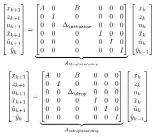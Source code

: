 %
\begin{equation}
    \begin{bmatrix}
        x_{k+1} \\
        z_{k+1} \\
        u_{k+1} \\
        \hat x_{k+1} \\
        \hat u_{k+1} \\
        \hat y_{k} \\
    \end{bmatrix} = \underbrace{\begin{bmatrix}
        A & 0 & B & 0 & 0 & 0 \\
        0 & I & 0 & 0 & 0 & 0 \\
        0 & 0 & \Delta_\actuator & 0 & 0 & 0 \\
        0 & 0 & 0 & I & 0 & 0 \\
        0 & 0 & 0 & 0 & I & 0 \\
        0 & 0 & 0 & 0 & 0 & I
    \end{bmatrix}}_{A_{\drop\miss\ndrop}}\, \begin{bmatrix}
        x_{k} \\
        z_{k} \\
        u_{k} \\
        \hat x_{k} \\
        \hat u_{k} \\
        \hat y_{k-1} \\
    \end{bmatrix}
\end{equation}
%
\begin{equation}
    \begin{bmatrix}
        x_{k+1} \\
        z_{k+1} \\
        u_{k+1} \\
        \hat x_{k+1} \\
        \hat u_{k+1} \\
        \hat y_{k} \\
    \end{bmatrix} = \underbrace{\begin{bmatrix}
        A & 0 & B & 0 & 0 & 0 \\
        0 & I & 0 & 0 & 0 & 0 \\
        0 & 0 & \Delta_\drop & 0 & 0 & 0 \\
        0 & 0 & 0 & I & 0 & 0 \\
        0 & 0 & 0 & 0 & I & 0 \\
        0 & 0 & 0 & 0 & 0 & I
    \end{bmatrix}}_{A_{\ndrop\miss\drop}}\, \begin{bmatrix}
        x_{k} \\
        z_{k} \\
        u_{k} \\
        \hat x_{k} \\
        \hat u_{k} \\
        \hat y_{k-1} \\
    \end{bmatrix}
\end{equation}
